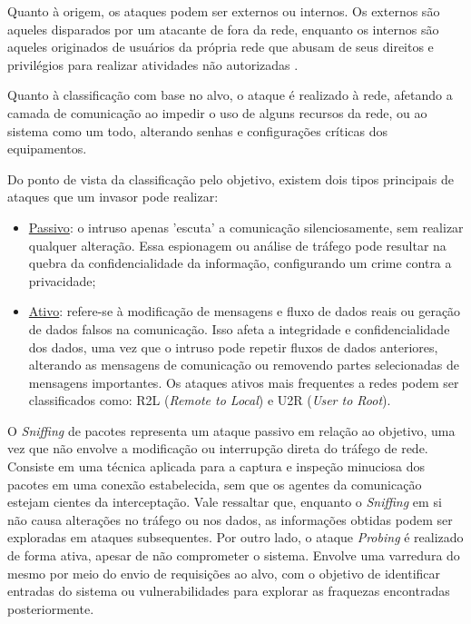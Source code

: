        Quanto à origem, os ataques podem ser externos ou internos. Os externos são aqueles disparados por um atacante de fora da rede, enquanto os internos são aqueles originados de usuários da própria rede que abusam de seus direitos e privilégios para realizar atividades não autorizadas \cite{turcato2020}.

        Quanto à classificação com base no alvo, o ataque é realizado à rede, afetando a camada de comunicação ao impedir o uso de alguns recursos da rede, ou ao sistema como um todo, alterando senhas e configurações críticas dos equipamentos.

        Do ponto de vista da classificação pelo objetivo, existem dois tipos principais de ataques que um invasor pode realizar:

        \begin{itemize}
            \item \underline{Passivo}: o intruso apenas 'escuta' a comunicação silenciosamente, sem realizar qualquer alteração. Essa espionagem ou análise de tráfego pode resultar na quebra da confidencialidade da informação, configurando um crime contra a privacidade;
            \item \underline{Ativo}: refere-se à modificação de mensagens e fluxo de dados reais ou geração de dados falsos na comunicação. Isso afeta a integridade e confidencialidade dos dados, uma vez que o intruso pode repetir fluxos de dados anteriores, alterando as mensagens de comunicação ou removendo partes selecionadas de mensagens importantes. Os ataques ativos mais frequentes a redes podem ser classificados como: R2L (\textit{Remote to Local}) e U2R (\textit{User to Root}).
        \end{itemize}
        
        O \textit{Sniffing} de pacotes representa um ataque passivo em relação ao objetivo, uma vez que não envolve a modificação ou interrupção direta do tráfego de rede. Consiste em uma técnica aplicada para a captura e inspeção minuciosa dos pacotes em uma conexão estabelecida, sem que os agentes da comunicação estejam cientes da interceptação. Vale ressaltar que, enquanto o \textit{Sniffing} em si não causa alterações no tráfego ou nos dados, as informações obtidas podem ser exploradas em ataques subsequentes. Por outro lado, o ataque \textit{Probing} é realizado de forma ativa, apesar de não comprometer o sistema. Envolve uma varredura do mesmo por meio do envio de requisições ao alvo, com o objetivo de identificar entradas do sistema ou vulnerabilidades para explorar as fraquezas encontradas posteriormente.
        
